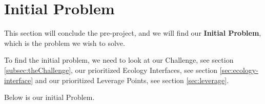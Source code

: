 \section{Initial Problem}
This section will conclude the pre-project, and we will find our \textbf{Initial Problem}, which is the problem we wish to solve.

To find the initial problem, we need to look at our Challenge, see section \ref{subsec:theChallenge}, our prioritized Ecology Interfaces, see section \ref{sec:ecology-interface} and our prioritized Leverage Points, see section \ref{sec:leverage}.

Below is our initial Problem.

\noindent{} \\



